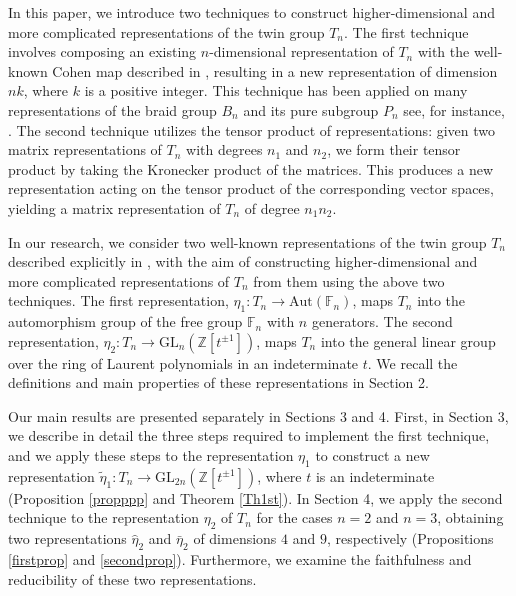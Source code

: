 \documentclass[reqno]{amsart}
\begin{document}
In this paper, we introduce two techniques to construct higher-dimensional and more complicated representations of the twin group $T_n$. The first technique involves composing an existing $n$-dimensional representation of $T_n$ with the well-known Cohen map described in \cite{Cohen1996}, resulting in a new representation of dimension $nk$, where $k$ is a positive integer. This technique has been applied on many representations of the braid group $B_n$ and its pure subgroup $P_n$ see, for instance, \cite{Abdulrahim2003, Abdulrahim2005,Nasser2020}. The second technique utilizes the tensor product of representations: given two matrix representations of $T_n$ with degrees $n_1$ and $n_2$, we form their tensor product by taking the Kronecker product of the matrices. This produces a new representation acting on the tensor product of the corresponding vector spaces, yielding a matrix representation of $T_n$ of degree $n_1 n_2$. \vspace*{0.15cm}

In our research, we consider two well-known representations of the twin group $T_n$ described explicitly in \cite{Nasser2025}, with the aim of constructing higher-dimensional and more complicated representations of $T_n$ from them using the above two techniques. The first representation, $\eta_1: T_n \longrightarrow \text{Aut}(\mathbb{F}_n)$, maps $T_n$ into the automorphism group of the free group $\mathbb{F}_n$ with $n$ generators. The second representation, $\eta_2: T_n \longrightarrow \text{GL}_n(\mathbb{Z}[t^{\pm 1}])$, maps $T_n$ into the general linear group over the ring of Laurent polynomials in an indeterminate $t$. We recall the definitions and main properties of these representations in Section 2. \vspace*{0.15cm}

Our main results are presented separately in Sections 3 and 4. First, in Section 3, we describe in detail the three steps required to implement the first technique, and we apply these steps to the representation $\eta_1$ to construct a new representation $\widetilde{\eta}_1: T_n \longrightarrow \mathrm{GL}_{2n}(\mathbb{Z}[t^{\pm1}])$, where $t$ is an indeterminate (Proposition \ref{propppp} and Theorem \ref{Th1st}). In Section 4, we apply the second technique to the representation $\eta_2$ of $T_n$ for the cases $n=2$ and $n=3$, obtaining two representations $\hat{\eta}_2$ and $\bar{\eta}_2$ of dimensions $4$ and $9$, respectively (Propositions \ref{firstprop} and \ref{secondprop}). Furthermore, we examine the faithfulness and reducibility of these two representations.
\end{document}
